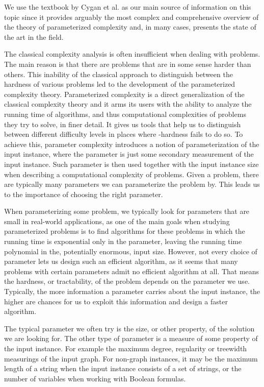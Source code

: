 We use the textbook by Cygan et al. \cite{Cygan2015} as our main source of information on this topic since it
provides arguably the most complex and comprehensive overview of the theory of parameterized complexity and,
in many cases, presents the state of the art in the field.

The classical complexity analysis is often insufficient when dealing with \NPh problems.
The main reason is that there are \NPh problems that are in some sense harder than others.
This inability of the classical approach to distinguish between the hardness of various \NPh problems
led to the development of the parameterized complexity theory.
Parameterized complexity is a direct generalization of the classical complexity theory and it arms its users
with the ability to analyze the running time of algorithms, and thus computational complexities of problems
they try to solve, in finer detail.
It gives us tools that help us to distinguish between different difficulty levels in places where
\NP-hardness fails to do so.
To achieve this, parameter complexity introduces a notion of parameterization of the input instance, where
the parameter is just some secondary measurement of the input instance.
Such parameter is then used together with the input instance size when describing a computational complexity of \NPh problems.
Given a problem, there are typically many parameters we can parameterize the problem by.
This leads us to the importance of choosing the right parameter.

When parameterizing some problem, we typically look for parameters that are small in real-world applications,
as one of the main goals when studying parameterized problems is to find algorithms for these problems in which
the running time is exponential only in the parameter, leaving the running time polynomial in the, potentially enormous, input size.
However, not every choice of parameter lets us design such an efficient algorithm, as it seems that many problems with
certain parameters admit no efficient algorithm at all.
That means the hardness, or tractability, of the problem depends on the parameter we use.
Typically, the more information a parameter carries about the input instance, the higher are chances for us to exploit this
information and design a faster algorithm.

The typical parameter we often try is the size, or other property, of the solution we are looking for.
The other type of parameter is a measure of some property of the input instance.
For example the maximum degree, regularity or treewidth measurings of the input graph.
For non-graph instances, it may be the maximum length of a string when the input instance consists of a set of strings,
or the number of variables when working with Boolean formulas.

